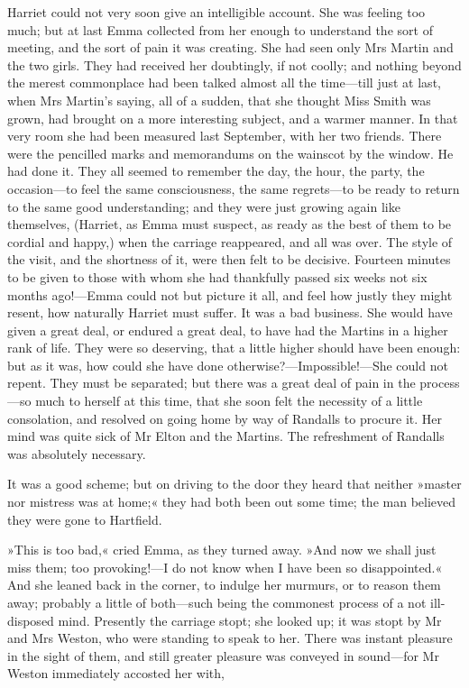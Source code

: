 Harriet could not very soon give an intelligible account. She was feeling too much; but at last Emma collected from her enough to understand the sort of meeting, and the sort of pain it was creating. She had seen only Mrs Martin and the two girls. They had received her doubtingly, if not coolly; and nothing beyond the merest commonplace had been talked almost all the time—till just at last, when Mrs Martin's saying, all of a sudden, that she thought Miss Smith was grown, had brought on a more interesting subject, and a warmer manner. In that very room she had been measured last September, with her two friends. There were the pencilled marks and memorandums on the wainscot by the window. He had done it. They all seemed to remember the day, the hour, the party, the occasion—to feel the same consciousness, the same regrets—to be ready to return to the same good understanding; and they were just growing again like themselves, (Harriet, as Emma must suspect, as ready as the best of them to be cordial and happy,) when the carriage reappeared, and all was over. The style of the visit, and the shortness of it, were then felt to be decisive. Fourteen minutes to be given to those with whom she had thankfully passed six weeks not six months ago!—Emma could not but picture it all, and feel how justly they might resent, how naturally Harriet must suffer. It was a bad business. She would have given a great deal, or endured a great deal, to have had the Martins in a higher rank of life. They were so deserving, that a little higher should have been enough: but as it was, how could she have done otherwise?—Impossible!—She could not repent. They must be separated; but there was a great deal of pain in the process—so much to herself at this time, that she soon felt the necessity of a little consolation, and resolved on going home by way of Randalls to procure it. Her mind was quite sick of Mr Elton and the Martins. The refreshment of Randalls was absolutely necessary.

It was a good scheme; but on driving to the door they heard that neither »master nor mistress was at home;« they had both been out some time; the man believed they were gone to Hartfield.

»This is too bad,« cried Emma, as they turned away. »And now we shall just miss them; too provoking!—I do not know when I have been so disappointed.« And she leaned back in the corner, to indulge her murmurs, or to reason them away; probably a little of both—such being the commonest process of a not ill-disposed mind. Presently the carriage stopt; she looked up; it was stopt by Mr and Mrs Weston, who were standing to speak to her. There was instant pleasure in the sight of them, and still greater pleasure was conveyed in sound—for Mr Weston immediately accosted her with,

